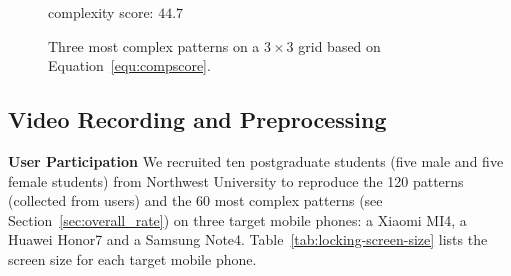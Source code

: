 \begin{figure}[!t]
{\begin{minipage}[b]{0.12\textwidth}
                \centering  complexity score: $44.7$
                \end{minipage}
            }
            \vspace{-2mm}
            \caption{Three most complex patterns on a $3\times 3$ grid based on Equation~\ref{equ:compscore}.}
            \vspace{-2mm}
            \label{fig:most complex patterns}
        \end{figure}

    \subsection{Video Recording and Preprocessing}

    \noindent\textbf{User Participation} We recruited ten postgraduate students (five male and five female
    students) from Northwest University to reproduce the 120 patterns (collected from users)
    and the 60 most complex patterns (see Section~\ref{sec:overall_rate})  on three target mobile phones:
    a Xiaomi MI4, a Huawei Honor7 and a Samsung Note4. Table~\ref{tab:locking-screen-size} lists
    the screen size for each target mobile phone.

